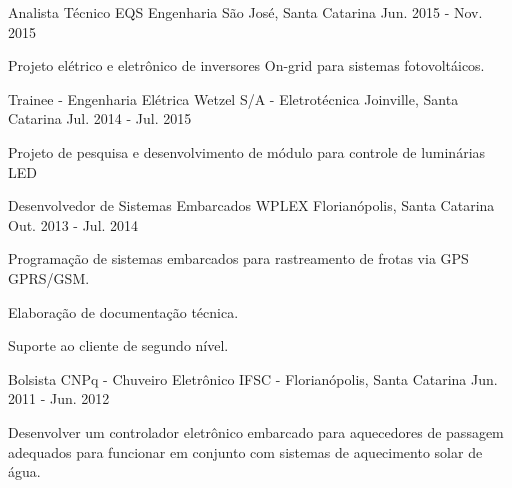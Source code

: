 \begin{cventries}
  \cventry
    {Analista Técnico} %
    {EQS Engenharia} %
    {São José, Santa Catarina} %
    {Jun. 2015 - Nov. 2015} %
    {
      \begin{cvitems} %
        \item {Projeto elétrico e eletrônico de inversores On-grid para sistemas fotovoltáicos.}
      \end{cvitems}
    }

  \cventry
    {Trainee - Engenharia Elétrica} %
    {Wetzel S/A - Eletrotécnica} %
    {Joinville, Santa Catarina} %
    {Jul. 2014 - Jul. 2015} %
    {
      \begin{cvitems} %
        \item {Projeto de pesquisa e desenvolvimento de módulo para controle de luminárias LED}
      \end{cvitems}
    }

  \cventry
    {Desenvolvedor de Sistemas Embarcados} %
    {WPLEX} %
    {Florianópolis, Santa Catarina} %
    {Out. 2013 - Jul. 2014} %
    {
      \begin{cvitems} %
        \item {Programação de sistemas embarcados para rastreamento de frotas via GPS GPRS/GSM. }
        \item {Elaboração de documentação técnica.}
        \item {Suporte ao cliente de segundo nível.}
      \end{cvitems}
    }

  \cventry
    {Bolsista} %
    {CNPq - Chuveiro Eletrônico} %
    {IFSC - Florianópolis, Santa Catarina} %
    {Jun. 2011 - Jun. 2012} %
    {
      \begin{cvitems} %
        \item {Desenvolver um controlador eletrônico embarcado para aquecedores de passagem adequados para funcionar em conjunto com sistemas de aquecimento solar de água.}
      \end{cvitems}
    }


\end{cventries}
